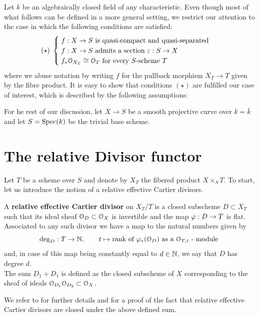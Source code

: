 	Let $k$ be an algebraically closed field of any characteristic. Even though most of what follows can be defined in a more general setting, we restrict our attention to the case in which the following conditions are satisfied:
	$$
		(\star)\;
		\begin{cases}
			\; f:X\to S \text{ is quasi-compact and quasi-separated } \\
			\; f:X\to S \text{ admits a section } \varepsilon:S\to X \\			
			\; f_*\mathcal{O}_{X_T} \cong \mathcal{O}_T \text{ for every $S$-scheme } T \\			
		\end{cases}
	$$
	where we abuse notation by writing $f$ for the pullback morphism $X_T\to T$ given by the fibre product. It is easy to show that conditions $(\star)$ are fulfilled our case of interest, which is described by the following assumptions:
	\begin{assumption}
		For he rest of our discussion, let $X\to S$ be a smooth projective curve over $k=\bar{k}$ and let $S=\operatorname{Spec}(k)$ be the trivial base scheme.
	\end{assumption}


\section{The relative Divisor functor}\label{sec:Div_functor}
	Let $T$ be a scheme over $S$ and denote by $X_T$ the fibered product $X\times_S T$. To start, let us introduce the notion of a relative effective Cartier divisors.
	\begin{defi}
		A \textbf{relative effective Cartier divisor} on $X_T/T$ is a closed subscheme $D\subset X_T$ such that its ideal sheaf $\mathcal{O}_D\subset \mathcal{O}_X$ is invertible and the map $\varphi: D\to T$ is flat.\\
		Associated to any such divisor we have a map to the natural numbers given by
		$$ \deg_D : T \to \mathbb{N}, \qquad t \mapsto \text{rank of } \varphi_*(\mathcal{O}_D) \text{ as a } \mathcal{O}_{T,t} \text{ - module } $$
		and, in case of this map being constantly equal to $d\in \mathbb{N}$, we say that $D$ has degree $d$.\\
		The sum $D_1 + D_1$ is defined as the closed subscheme of $X$ corresponding to the sheaf of ideals $\mathcal{O}_{D_1}\mathcal{O}_{D_2}\subset \mathcal{O}_X$.
	\end{defi}
	We refer to \cite[Tag 01WO]{stacks-project} for further details and for a proof of the fact that relative effective Cartier divisors are closed under the above defined sum.\\

